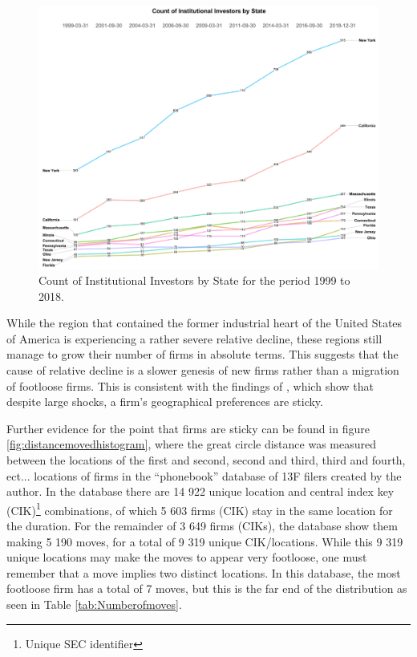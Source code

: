 \begin{figure}[h]
	\centering
	\includegraphics[width=1\linewidth]{Figures/ChapterIII/Count_II_BY_State}
	\caption[Count of Institutional Investors by State]{Count of Institutional Investors by State for the period 1999 to 2018.}
	\label{fig:countiibystate}
\end{figure}

While the region that contained the former industrial heart of the United States of America is experiencing a rather severe relative decline, these regions still manage to grow their number of firms in absolute terms.  This suggests that the cause of relative decline is a slower genesis of new firms rather than a migration of footloose firms.  This is consistent with the findings of \cite{gongthe2012}, which show that despite large shocks, a firm's geographical preferences are sticky.  

Further evidence for the point that firms are sticky can be found in figure \ref{fig:distancemovedhistogram}, where the great circle distance was measured between the locations of the first and second, second and third, third and fourth, ect... locations of firms in the ``phonebook'' database of 13F filers created by the author.  In the database there are 14 922 unique location and central index key (CIK)\footnote{Unique SEC identifier} combinations, of which 5 603 firms (CIK) stay in the same location for the duration.  For the remainder of 3 649 firms (CIKs), the database show them making 5 190 moves, for a total of 9 319 unique CIK/locations.  While this 9 319 unique locations may make the moves to appear very footloose, one must remember that a move implies two distinct locations.  In this database, the most footloose firm has a total of 7 moves, but this is the far end of the distribution as seen in Table \ref{tab:Numberofmoves}.  

